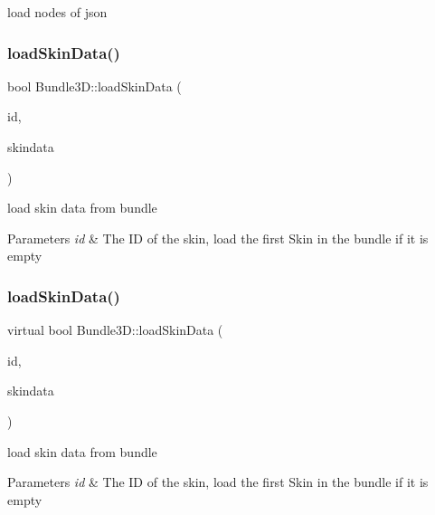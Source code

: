 load nodes of json \mbox{\label{classBundle3D_ae05b0ca31ac57e8184c06d64a8190995}} 
\subsubsection{\texorpdfstring{load\+Skin\+Data()}{loadSkinData()}\hspace{0.1cm}{\footnotesize\ttfamily [1/2]}}
{\footnotesize\ttfamily bool Bundle3\+D\+::load\+Skin\+Data (\begin{DoxyParamCaption}\item[{const std\+::string \&}]{id,  }\item[{\hyperlink{structSkinData}{Skin\+Data} $\ast$}]{skindata }\end{DoxyParamCaption})\hspace{0.3cm}{\ttfamily [virtual]}}

load skin data from bundle 
\begin{DoxyParams}{Parameters}
{\em id} & The ID of the skin, load the first Skin in the bundle if it is empty \\
\hline
\end{DoxyParams}
\mbox{\label{classBundle3D_ac7d550f1334d0cb561c098f93fd1caf1}} 
\subsubsection{\texorpdfstring{load\+Skin\+Data()}{loadSkinData()}\hspace{0.1cm}{\footnotesize\ttfamily [2/2]}}
{\footnotesize\ttfamily virtual bool Bundle3\+D\+::load\+Skin\+Data (\begin{DoxyParamCaption}\item[{const std\+::string \&}]{id,  }\item[{\hyperlink{structSkinData}{Skin\+Data} $\ast$}]{skindata }\end{DoxyParamCaption})\hspace{0.3cm}{\ttfamily [virtual]}}

load skin data from bundle 
\begin{DoxyParams}{Parameters}
{\em id} & The ID of the skin, load the first Skin in the bundle if it is empty \\
\hline
\end{DoxyParams}
\mbox{\label{classBundle3D_a0a7ca57fdb38995fa753d07beffb7501}} 
